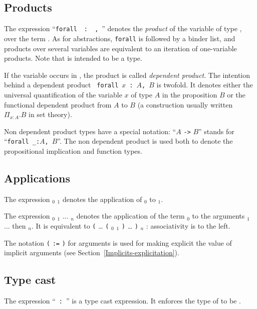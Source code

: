 \subsection{Products
\label{products}
}

The expression ``{\tt forall}~{\ident}~{\tt :}~{\type}{\tt
,}~{\term}'' denotes the {\em product} of the variable {\ident} of
type {\type}, over the term {\term}. As for abstractions, {\tt forall}
is followed by a binder list, and products over several variables are
equivalent to an iteration of one-variable products. 
Note that {\term} is intended to be a type.

If the variable {\ident} occurs in {\term}, the product is called {\em
dependent product}.  The intention behind a dependent product {\tt
forall}~$x$~{\tt :}~{$A$}{\tt ,}~{$B$} is twofold. It denotes either
the universal quantification of the variable $x$ of type $A$ in the
proposition $B$ or the functional dependent product from $A$ to $B$ (a
construction usually written $\Pi_{x:A}.B$ in set theory).

Non dependent product types have a special notation: ``$A$ {\tt ->}
$B$'' stands for ``{\tt forall \_:}$A${\tt ,}~$B$''. The non dependent
product is used both to denote the propositional implication and
function types.

\subsection{Applications
\label{applications}
}

The expression \term$_0$ \term$_1$ denotes the application of
\term$_0$ to \term$_1$.

The expression {\tt }\term$_0$ \term$_1$ ...  \term$_n${\tt}
denotes the application of the term \term$_0$ to the arguments
\term$_1$ ... then \term$_n$.  It is equivalent to {\tt (} {\ldots}
{\tt (} {\term$_0$} {\term$_1$} {\tt )} {\ldots} {\tt )} {\term$_n$} {\tt }:
associativity is to the left.

The notation {\tt (}\,{\ident}\,{\tt :=}\,{\term}\,{\tt )} for
arguments is used for making explicit the value of implicit arguments
(see Section~\ref{Implicits-explicitation}).

\subsection{Type cast
\label{typecast}
}

The expression ``{\term}~{\tt :}~{\type}'' is a type cast
expression. It enforces the type of {\term} to be {\type}.

